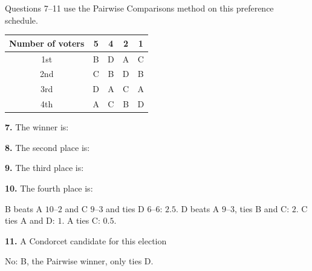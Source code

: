 \documentclass[12pt]{ximera}
\begin{document}
\begin{problem}
Questions 7--11 use the Pairwise Comparisons method on this preference schedule.
\begin{center}
\begin{tabular}{c|cccc}
Number of voters & 5 & 4 & 2 & 1\\\hline
1st & B & D & A & C\\
2nd & C & B & D & B\\
3rd & D & A & C & A\\
4th & A & C & B & D
\end{tabular}
\end{center}

\begin{prompt}
\textbf{7.} The winner is:
\begin{multipleChoice}
\end{multipleChoice}
\end{prompt}

\begin{prompt}
\textbf{8.} The second place is:
\begin{multipleChoice}
\end{multipleChoice}
\end{prompt}

\begin{prompt}
\textbf{9.} The third place is:
\begin{multipleChoice}
\end{multipleChoice}
\end{prompt}

\begin{prompt}
\textbf{10.} The fourth place is:
\begin{multipleChoice}
\end{multipleChoice}
\begin{feedback}
B beats A $10$--$2$ and C $9$--$3$ and ties D $6$--$6$: $2.5$. D beats A $9$--$3$, ties B and C: $2$. C ties A and D: $1$. A ties C: $0.5$.
\end{feedback}
\end{prompt}

\begin{prompt}
\textbf{11.} A Condorcet candidate for this election
\begin{multipleChoice}
\end{multipleChoice}
\begin{feedback}
No: B, the Pairwise winner, only ties D.
\end{feedback}
\end{prompt}
\end{problem}
\end{document}
